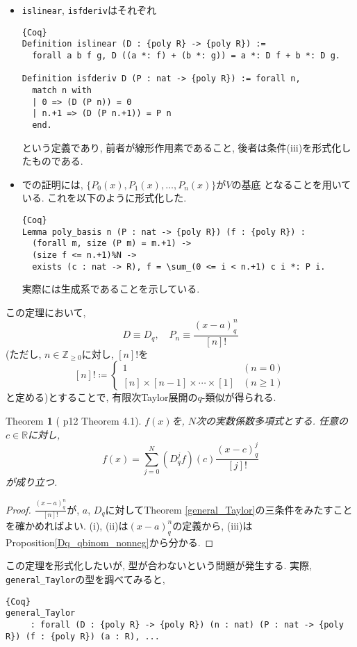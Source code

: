 \documentclass[11pt]{jarticle}
\theoremstyle{mystyle}
\newtheorem{thm}[df]{$\textrm{Theorem}$}
\newcommand{\bthm}{\begin{shadebox} \begin{thm}}
\newcommand{\ethm}{\end{thm} \end{shadebox}}
\newcommand{\bpf}{\begin{proof}}
\newcommand{\epf}{\end{proof}}
\newcommand{\Z}{\mathbb{Z}}
\newcommand{\R}{\mathbb{R}}
\newcommand{\0}{\textbf{0}}
\newcommand{\1}{\textbf{1}}
\newcommand{\2}{\textbf{2}}
\begin{document}
\begin{itemize}
  \item {\tt islinear}, {\tt isfderiv}はそれぞれ
    \begin{lstlisting}{Coq}
Definition islinear (D : {poly R} -> {poly R}) :=
  forall a b f g, D ((a *: f) + (b *: g)) = a *: D f + b *: D g.

Definition isfderiv D (P : nat -> {poly R}) := forall n,
  match n with
  | 0 => (D (P n)) = 0
  | n.+1 => (D (P n.+1)) = P n
  end. \end{lstlisting}
    という定義であり, 前者が線形作用素であること, 後者は条件(iii)を形式化したものである. 
  \item \cite{Kac}での証明には, $\{P_0(x), P_1(x), \ldots , P_n(x)\}$が$V$の基底
    となることを用いている. これを以下のように形式化した. 
    \begin{lstlisting}{Coq}
Lemma poly_basis n (P : nat -> {poly R}) (f : {poly R}) :
  (forall m, size (P m) = m.+1) ->
  (size f <= n.+1)%N ->
  exists (c : nat -> R), f = \sum_(0 <= i < n.+1) c i *: P i. \end{lstlisting}
    実際には生成系であることを示している. 
\end{itemize}
この定理において, 
\[
  D \equiv D_q, \quad P_n \equiv \frac{(x-a)^n_q}{[n]!}
\]
(ただし, $n\in\Z_{\ge0}$に対し, $[n]!$を
\[
    [n]! \coloneqq \begin{cases}
                          1 & (n=0)\\
                          [n]\times[n-1]\times\cdots\times[1] & (n\ge1)
                        \end{cases}
\]
と定める)とすることで, 有限次Taylor展開の$q$-類似が得られる. 
\bthm[\cite{Kac} p12 Theorem 4.1] \label{q_Taylor}
$f(x)$を, $N$次の実数係数多項式とする. 任意の$c\in\R$に対し, 
  \[
    f(x) = \sum_{j=0}^N (D_q^jf)(c)\frac{(x-c)^j_q}{[j]!}
  \]
が成り立つ. 
\ethm
\bpf
$\frac{(x-a)^n_q}{[n]!}$が, $a$, $D_q$に対してTheorem \ref{general_Taylor}の三条件をみたすことを確かめればよい. (i), (ii)は$(x-a)^n_q$の定義から, (iii)はProposition\ref{Dq_qbinom_nonneg}から分かる. 
\epf
この定理を形式化したいが, 型が合わないという問題が発生する. 実際, {\tt general\_Taylor}の型を調べてみると, 
\begin{lstlisting}{Coq}
general_Taylor
     : forall (D : {poly R} -> {poly R}) (n : nat) (P : nat -> {poly R}) (f : {poly R}) (a : R), ...\end{lstlisting}
\end{document}
